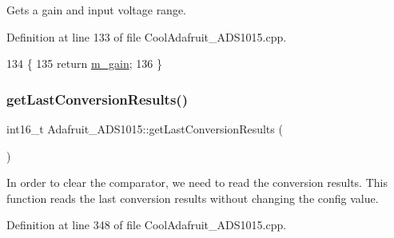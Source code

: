 Gets a gain and input voltage range. 



Definition at line 133 of file Cool\+Adafruit\+\_\+\+A\+D\+S1015.\+cpp.


\begin{DoxyCode}
134 \{
135   \textcolor{keywordflow}{return} \hyperlink{class_adafruit___a_d_s1015_a8db90fe03d55a18246984ba2ba5e7f32}{m\_gain};
136 \}
\end{DoxyCode}
\mbox{\label{class_adafruit___a_d_s1015_ad8f36d80847020778425107f6451a8c2}} 
\subsubsection{\texorpdfstring{get\+Last\+Conversion\+Results()}{getLastConversionResults()}}
{\footnotesize\ttfamily int16\+\_\+t Adafruit\+\_\+\+A\+D\+S1015\+::get\+Last\+Conversion\+Results (\begin{DoxyParamCaption}{ }\end{DoxyParamCaption})}



In order to clear the comparator, we need to read the conversion results. This function reads the last conversion results without changing the config value. 



Definition at line 348 of file Cool\+Adafruit\+\_\+\+A\+D\+S1015.\+cpp.


